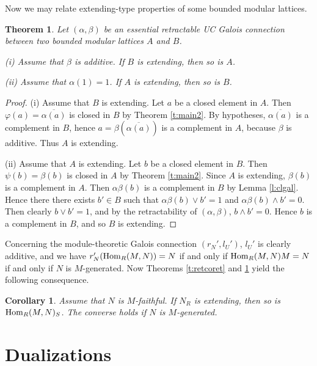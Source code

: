 \documentclass[11pt,a4paper]{amsart}
\newtheorem{thm}[theorem]{Theorem}
\newtheorem{cor}[theorem]{Corollary}
\begin{document}
Now we may relate extending-type properties of some bounded modular lattices. 

\begin{thm} \label{t:extending} Let $(\alpha,\beta)$ be an essential retractable UC Galois connection between two
bounded modular lattices $A$ and $B$.

(i) Assume that $\beta$ is additive. If $B$ is extending, then so is $A$. 

(ii) Assume that $\alpha(1)=1$. If $A$ is extending, then so is $B$. 
\end{thm}

\begin{proof} (i) Assume that $B$ is extending. Let $a$ be a closed element in $A$. Then
$\varphi(a)=\overline{\alpha(a)}$ is closed in $B$ by Theorem \ref{t:main2}. By hypotheses, $\overline{\alpha(a)}$ is a
complement in $B$, hence $a=\beta(\overline{\alpha(a)})$ is a complement in $A$, because $\beta$ is additive. Thus $A$
is extending.

(ii) Assume that $A$ is extending. Let $b$ be a closed element in $B$. Then $\psi(b)=\beta(b)$ is closed in $A$ by
Theorem \ref{t:main2}. Since $A$ is extending, $\beta(b)$ is a complement in $A$. Then $\alpha\beta(b)$ is a complement
in $B$ by Lemma \ref{l:clgal}. Hence there there exists $b'\in B$ such that $\alpha\beta(b)\vee b'=1$ and
$\alpha\beta(b)\wedge b'=0$. Then clearly $b\vee b'=1$, and by the retractability of $(\alpha,\beta)$, $b\wedge b'=0$.
Hence $b$ is a complement in $B$, and so $B$ is extending.
\end{proof}

Concerning the module-theoretic Galois connection $(r_N',l_U')$, $l_U'$ is clearly additive, and we have 
$r_N'({{\rm Hom}}_R(M,N))=N$ if and only if ${{\rm Hom}}_R(M,N)M=N$ if and only if $N$ is $M$-generated. Now Theorems \ref{t:retcoret}
and \ref{t:extending} yield the following consequence.

\begin{cor} \cite[Corollary~1.3]{Z} Assume that $N$ is $M$-faithful. If $N_R$ is extending, then so is ${{\rm Hom}}_R(M,N)_S$.
The converse holds if $N$ is $M$-generated.  
\end{cor}

\section{Dualizations}
\end{document}
